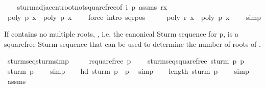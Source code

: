 \begin{isabellebody}
\ \ \isamarkupfalse%
\ sturm{\isacharunderscore}adjacent{\isacharunderscore}root{\isacharunderscore}not{\isacharunderscore}squarefree{\isacharbrackleft}of\ i\ p{\isacharbrackright}\ assms\ r{\isacharunderscore}x\isanewline
\ \ \ \ \ \ \isamarkupfalse%
\ {\isachardoublequoteopen}poly\ {\isacharquery}p\ x\ {\isacharasterisk}\ poly\ {\isacharquery}p\ x\ {\isachargreater}\ {}{\isachardoublequoteclose}\ \isamarkupfalse%
\ {\isacharparenleft}force\ intro{\isacharcolon}\ sqr{\isacharunderscore}pos{\isacharparenright}\isanewline
\ \ \isamarkupfalse%
\ \isamarkupfalse%
\ {\isachardoublequoteopen}poly\ {\isacharquery}r\ x\ {\isacharasterisk}\ poly\ {\isacharquery}p\ x\ {\isacharless}\ {}{\isachardoublequoteclose}\ \isamarkupfalse%
\ simp\isanewline
{}\isamarkupfalse%
%
\endisatagproof
{\isafoldproof}%
%
\isadelimproof
%
\endisadelimproof
%
\begin{isamarkuptext}%
If  contains no multiple roots, , i.e. 
  the canonical Sturm sequence for p, is a squarefree Sturm sequence 
  that can be used to determine the number of roots of .%
\end{isamarkuptext}%
\isamarkuptrue%
\isamarkupfalse%
\ sturm{\isacharunderscore}seq{\isacharunderscore}sturm{\isacharbrackleft}simp{\isacharbrackright}{\isacharcolon}\ \isanewline
\ \ \ \ {\isachardoublequoteopen}rsquarefree\ p{\isachardoublequoteclose}\isanewline
\ \ \ \ {\isachardoublequoteopen}sturm{\isacharunderscore}seq{\isacharunderscore}squarefree\ {\isacharparenleft}sturm\ p{\isacharparenright}\ p{\isachardoublequoteclose}\isanewline
%
\isadelimproof
%
\endisadelimproof
%
\isatagproof
{}\isamarkupfalse%
\isanewline
\ \ \isamarkupfalse%
\ {\isachardoublequoteopen}sturm\ p\ {\isasymnoteq}\ {\isacharbrackleft}{\isacharbrackright}{\isachardoublequoteclose}\ \isamarkupfalse%
\ simp\isanewline
\ \ \isamarkupfalse%
\ {\isachardoublequoteopen}hd\ {\isacharparenleft}sturm\ p{\isacharparenright}\ {\isacharequal}\ p{\isachardoublequoteclose}\ \isamarkupfalse%
\ simp\isanewline
\ \ \isamarkupfalse%
\ {\isachardoublequoteopen}length\ {\isacharparenleft}sturm\ p{\isacharparenright}\ {\isasymge}\ {}{\isachardoublequoteclose}\ \isamarkupfalse%
\ simp\isanewline
\ \ \isamarkupfalse%
\ assms\ \isamarkupfalse%

\end{isabellebody}
